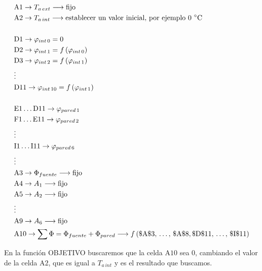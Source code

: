 \documentclass[11pt]{article}
\begin{document}
\begin{enumerate}
    \[ \begin{aligned}
        & \mathrm{A} 1 \rightarrow T_{ a \, ext } \longrightarrow \text{fijo} \\
        & \mathrm{A} 2 \rightarrow T_{ a \, int } \longrightarrow \text{establecer un valor inicial, por ejemplo 0 \degree C} \\
        & \\
        & \mathrm{D} 1 \rightarrow \varphi _{ int \, 0 } = 0 \\
        & \mathrm{D} 2 \rightarrow \varphi _{ int \, 1 } = f \left( \varphi _{ int \, 0 } \right) \\ 
        & \mathrm{D} 3 \rightarrow \varphi _{ int \, 2 } = f \left( \varphi _{ int \, 1 } \right) \\ 
        & \vdots \\
        & \mathrm{D} 11 \rightarrow \varphi _{ int \, 10 } = f \left( \varphi _{ int \, 1 } \right) \\ 
        & \\
        & \mathrm{E} 1 \ldots \mathrm{D} 11 \rightarrow \varphi _{ pared \, 1 } \\ 
        & \mathrm{F} 1 \ldots \mathrm{E} 11 \rightarrow \varphi _{ pared \, 2 } \\
        & \vdots \\
        & \mathrm{I} 1 \ldots \mathrm{I} 11 \rightarrow \varphi _{ pared \, 6 } \\
        & \vdots \\
        & \mathrm{A} 3 \rightarrow \Phi _{ fuente } \longrightarrow \text{fijo} \\
        & \mathrm{A} 4 \rightarrow A_1 \longrightarrow \text{fijo} \\
        & \mathrm{A} 5 \rightarrow A_2 \longrightarrow \text{fijo} \\
        & \vdots \\
        & \mathrm{A} 9 \rightarrow A_6 \longrightarrow \text{fijo} \\
        &\mathrm{A} 10 \rightarrow \sum{ \Phi } = \Phi _{ fuente } + \Phi _{ pared } \longrightarrow f \left( \$ \mathrm{A} \$ 3, \, \ldots , \, \$ \mathrm{A} \$ 8, \$ \mathrm{D} \$ 11, \, \ldots , \, \$ \mathrm{I} \$ 11 \right)
    \end{aligned} \]

    En la función OBJETIVO buscaremos que la celda $ \mathrm{A} 10 $ sea 0, cambiando el valor de la celda $ \mathrm{A} 2 $, que es igual a $ T_{ a \, int } $ y es el resultado que buscamos.  

    \[ \]

\end{enumerate}
\end{document}
